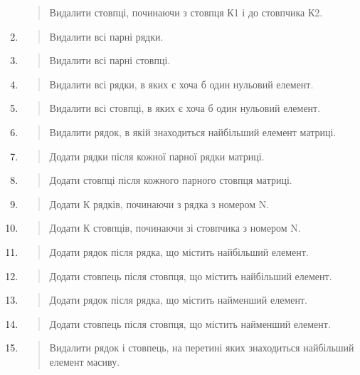 \documentclass[]{article}
\begin{document}
\begin{enumerate}
  \begin{quote}
  Видалити стовпці, починаючи з стовпця К1 і до стовпчика К2.
  \end{quote}
\item
  \begin{quote}
  Видалити всі парні рядки.
  \end{quote}
\item
  \begin{quote}
  Видалити всі парні стовпці.
  \end{quote}
\item
  \begin{quote}
  Видалити всі рядки, в яких є хоча б один нульовий елемент.
  \end{quote}
\item
  \begin{quote}
  Видалити всі стовпці, в яких є хоча б один нульовий елемент.
  \end{quote}
\item
  \begin{quote}
  Видалити рядок, в якій знаходиться найбільший елемент матриці.
  \end{quote}
\item
  \begin{quote}
  Додати рядки після кожної парної рядки матриці.
  \end{quote}
\item
  \begin{quote}
  Додати стовпці після кожного парного стовпця матриці.
  \end{quote}
\item
  \begin{quote}
  Додати К рядків, починаючи з рядка з номером N.
  \end{quote}
\item
  \begin{quote}
  Додати К стовпців, починаючи зі стовпчика з номером N.
  \end{quote}
\item
  \begin{quote}
  Додати рядок після рядка, що містить найбільший елемент.
  \end{quote}
\item
  \begin{quote}
  Додати стовпець після стовпця, що містить найбільший елемент.
  \end{quote}
\item
  \begin{quote}
  Додати рядок після рядка, що містить найменший елемент.
  \end{quote}
\item
  \begin{quote}
  Додати стовпець після стовпця, що містить найменший елемент.
  \end{quote}
\item
  \begin{quote}
  Видалити рядок і стовпець, на перетині яких знаходиться найбільший
  елемент масиву.
  \end{quote}
\end{enumerate}
\end{document}
